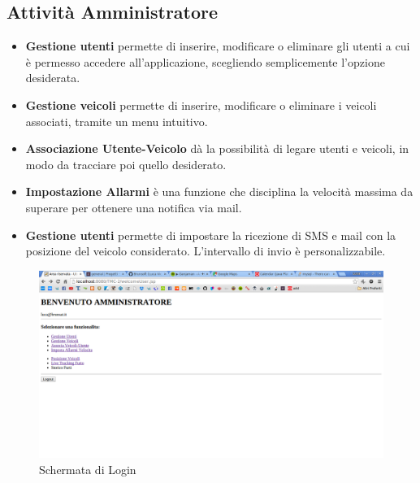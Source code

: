 \documentclass[a4paper,12pt]{article}
\begin{document}
\subsection{Attività Amministratore}
\begin{itemize}
\item \textbf{Gestione utenti} permette di inserire, modificare o eliminare gli utenti a cui è permesso accedere all'applicazione, scegliendo semplicemente l'opzione desiderata.

\item \textbf{Gestione veicoli} permette di inserire, modificare o eliminare i veicoli associati, tramite un menu intuitivo.

\item \textbf{Associazione Utente-Veicolo} dà la possibilità di legare utenti e veicoli, in modo da tracciare poi quello desiderato.

\item \textbf{Impostazione Allarmi} è una funzione che disciplina la velocità massima da superare per ottenere una notifica via mail.

\item \textbf{Gestione utenti} permette di impostare la ricezione di SMS e mail con la posizione del veicolo considerato. L'intervallo di invio è personalizzabile.

\end{itemize}

\begin{figure}[htbp]
\centering
\includegraphics[trim={0 8cm 20.4cm 2.3cm}, clip, scale=0.6]{Home.png}
\caption{Schermata di Login \label{fig:home}}
\end{figure}
\end{document}
